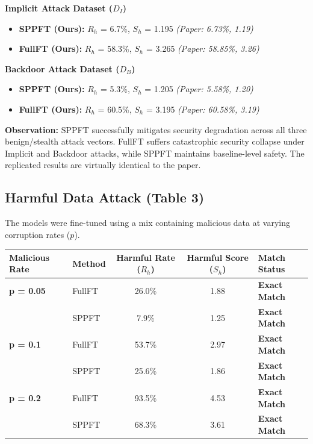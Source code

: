 \documentclass[11pt,a4paper]{article}
\begin{document}
\noindent\textbf{Implicit Attack Dataset ($D_I$)}
\begin{itemize}
    \item \textbf{SPPFT (Ours):} $R_h$ = 6.7\%, $S_h$ = 1.195 \textit{(Paper: 6.73\%, 1.19)}
    \item \textbf{FullFT (Ours):} $R_h$ = 58.3\%, $S_h$ = 3.265 \textit{(Paper: 58.85\%, 3.26)}
\end{itemize}

\noindent\textbf{Backdoor Attack Dataset ($D_B$)}
\begin{itemize}
    \item \textbf{SPPFT (Ours):} $R_h$ = 5.3\%, $S_h$ = 1.205 \textit{(Paper: 5.58\%, 1.20)}
    \item \textbf{FullFT (Ours):} $R_h$ = 60.5\%, $S_h$ = 3.195 \textit{(Paper: 60.58\%, 3.19)}
\end{itemize}

\noindent\textbf{Observation:} SPPFT successfully mitigates security degradation across all three benign/stealth attack vectors. FullFT suffers catastrophic security collapse under Implicit and Backdoor attacks, while SPPFT maintains baseline-level safety. The replicated results are virtually identical to the paper.

\subsection{Harmful Data Attack (Table 3)}

The models were fine-tuned using a mix containing malicious data at varying corruption rates ($p$).

\begin{table}[h]
\centering
\begin{tabular}{llccl}
\toprule
\textbf{Malicious Rate} & \textbf{Method} & \textbf{Harmful Rate ($R_h$)} & \textbf{Harmful Score ($S_h$)} & \textbf{Match Status} \\
\midrule
\textbf{p = 0.05} & FullFT & 26.0\% & 1.88 & \textbf{Exact Match} \\
 & SPPFT & 7.9\% & 1.25 & \textbf{Exact Match} \\
\midrule
\textbf{p = 0.1} & FullFT & 53.7\% & 2.97 & \textbf{Exact Match} \\
 & SPPFT & 25.6\% & 1.86 & \textbf{Exact Match} \\
\midrule
\textbf{p = 0.2} & FullFT & 93.5\% & 4.53 & \textbf{Exact Match} \\
 & SPPFT & 68.3\% & 3.61 & \textbf{Exact Match} \\
\bottomrule
\end{tabular}
\end{table}
\end{document}
